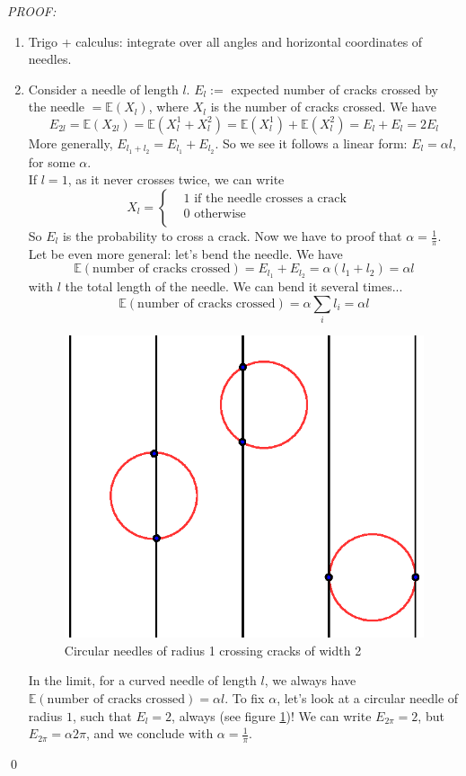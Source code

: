 \textit{PROOF:}
\begin{enumerate}
\item Trigo + calculus: integrate over all angles and horizontal coordinates of needles.
\item Consider a needle of length $l$.
$E_l := $ expected number of cracks crossed by the needle $= \mathbb{E}(X_l)$, where $X_l$ is the number of cracks crossed. We have
$$
E_{2l} = \mathbb{E}(X_{2l}) = \mathbb{E}(X_l^1+X_l^2) = \mathbb{E}(X_l^1) + \mathbb{E}(X_l^2) = E_l + E_l = 2E_l
$$
More generally, $E_{l_1+l_2} = E_{l_1} + E_{l_2}$. So we see it follows a linear form: $E_l = \alpha l$, for some $\alpha$.\\
If $l=1$, as it never crosses twice, we can write 
$$
X_l = \left\{
      \begin{aligned}
        &1 \text{ if the needle crosses a crack}& \\
        &0 \text{ otherwise}& \\
      \end{aligned}
    \right.
$$
    So $E_l$ is the probability to cross a crack. Now we have to proof that $\alpha = \frac{1}{\pi}$.\\
Let be even more general: let's bend the needle. We have
$$
\mathbb{E}(\text{number of cracks crossed}) = E_{l_1} + E_{l_2}
= \alpha (l_1 + l_2)
= \alpha l
$$
with $l$ the total length of the needle. We can bend it several times...
$$
\mathbb{E}(\text{number of cracks crossed}) = \alpha \sum_i l_i = \alpha l
$$

\begin{figure}[h]
\centering
\includegraphics[scale=0.7]{images/circles.eps}
\caption{Circular needles of radius 1 crossing cracks of width 2}
\label{circles}
\end{figure}

In the limit, for a curved needle of length $l$, we always have $\mathbb{E}(\text{number of cracks crossed}) = \alpha l$. To fix $\alpha$, let's look at a circular needle of radius $1$, such that $E_l=2$, always (see figure \ref{circles})! We can write $E_{2\pi} = 2$, but $E_{2\pi} = \alpha 2 \pi$, and we conclude with $\alpha = \frac{1}{\pi} $.
\end{enumerate} \qed

